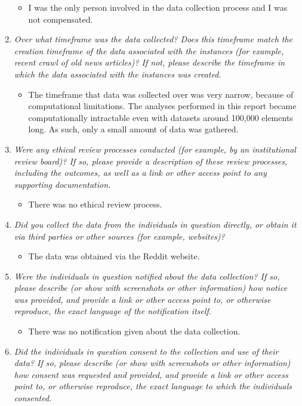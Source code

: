 \documentclass[
]{article}
\providecommand{\tightlist}{%
  \setlength{\itemsep}{0pt}\setlength{\parskip}{0pt}}
\begin{document}
\begin{enumerate}
  \begin{itemize}
  \tightlist
  \item
    I was the only person involved in the data collection process and I was not compensated.
  \end{itemize}
\item
  \emph{Over what timeframe was the data collected? Does this timeframe match the creation timeframe of the data associated with the instances (for example, recent crawl of old news articles)? If not, please describe the timeframe in which the data associated with the instances was created.}

  \begin{itemize}
  \tightlist
  \item
    The timeframe that data was collected over was very narrow, because of computational limitations. The analyses performed in this report became computationally intractable even with datasets around 100,000 elements long. As such, only a small amount of data was gathered.
  \end{itemize}
\item
  \emph{Were any ethical review processes conducted (for example, by an institutional review board)? If so, please provide a description of these review processes, including the outcomes, as well as a link or other access point to any supporting documentation.}

  \begin{itemize}
  \tightlist
  \item
    There was no ethical review process.
  \end{itemize}
\item
  \emph{Did you collect the data from the individuals in question directly, or obtain it via third parties or other sources (for example, websites)?}

  \begin{itemize}
  \tightlist
  \item
    The data was obtained via the Reddit website.
  \end{itemize}
\item
  \emph{Were the individuals in question notified about the data collection? If so, please describe (or show with screenshots or other information) how notice was provided, and provide a link or other access point to, or otherwise reproduce, the exact language of the notification itself.}

  \begin{itemize}
  \tightlist
  \item
    There was no notification given about the data collection.
  \end{itemize}
\item
  \emph{Did the individuals in question consent to the collection and use of their data? If so, please describe (or show with screenshots or other information) how consent was requested and provided, and provide a link or other access point to, or otherwise reproduce, the exact language to which the individuals consented.}


\end{enumerate}
\end{document}
